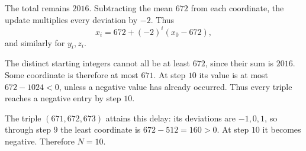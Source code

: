 The total remains $2016$. Subtracting the mean $672$ from each coordinate, the update multiplies every deviation by $-2$. Thus
\[
x_i=672+(-2)^i(x_0-672),
\]
and similarly for $y_i,z_i$.

The distinct starting integers cannot all be at least $672$, since their sum is $2016$. Some coordinate is therefore at most $671$. At step $10$ its value is at most $672-1024<0$, unless a negative value has already occurred. Thus every triple reaches a negative entry by step $10$.

The triple $(671,672,673)$ attains this delay: its deviations are $-1,0,1$, so through step $9$ the least coordinate is $672-512=160>0$. At step $10$ it becomes negative. Therefore $\boxed{N=10}$.
